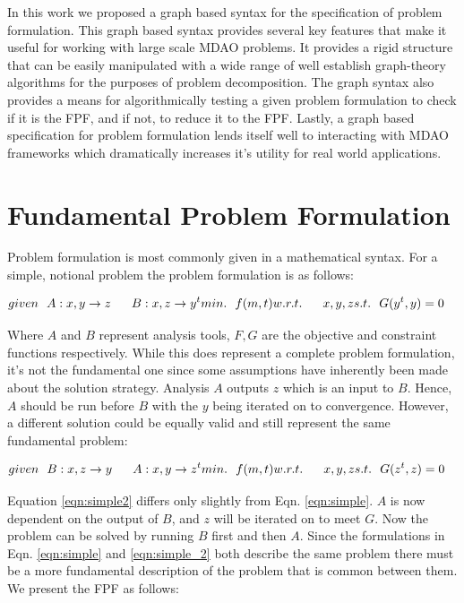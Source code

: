     In this work we proposed a graph based syntax for the specification of problem formulation. This graph based syntax provides several key
    features that make it useful for working with large scale MDAO problems. It provides a rigid structure that can be easily manipulated 
    with a wide range of well establish graph-theory algorithms for the purposes of problem decomposition. The graph syntax also 
    provides a means for algorithmically testing a given problem formulation to check if it is the FPF, and if not, to reduce it to the FPF. 
    Lastly, a graph based specification for problem formulation lends itself well to interacting with MDAO frameworks which dramatically 
    increases it's utility for real world applications. 


\section{Fundamental Problem Formulation}
    Problem formulation is most commonly given in a mathematical syntax. For a simple, notional problem 
    the problem formulation is as follows: 

    \begin{align}
        given & \ \ A: {x,y} \rightarrow {z}
              & \ \ B: {x,z} \rightarrow {y^t}
        min. &\ \ f(m,t) \notag
        w.r.t. & \ \ x,y,z \notag
        s.t. & \ \ G(y^t,y) = 0
        \label{eqn:simple}
    \end{align}

    Where $A$ and $B$ represent analysis tools, $F,G$ are the objective and constraint functions respectively. 
    While this does represent a complete problem formulation, 
    it's not the fundamental one since some assumptions have inherently been made about the solution 
    strategy. Analysis $A$ outputs $z$ which is an input to $B$. Hence, $A$ should be run before $B$ with 
    the $y$ being iterated on to convergence. However, a different solution could be equally valid and still represent
    the same fundamental problem: 

    \begin{align}
        given & \ \ B: {x,z} \rightarrow {y}
              & \ \ A: {x,y} \rightarrow {z^t}
        min. &\ \ f(m,t) \notag
        w.r.t. & \ \ x,y,z \notag
        s.t. & \ \ G(z^t,z) = 0
        \label{eqn:simple2}
    \end{align}

    Equation \ref{eqn:simple2} differs only slightly from Eqn. \ref{eqn:simple}. $A$ is now dependent on the output of $B$, 
    and $z$ will be iterated on to meet $G$. Now the problem can be solved by running $B$ first and then $A$.
    Since the formulations in Eqn. \ref{eqn:simple} and \ref{eqn:simple_2} both describe the same problem 
    there must be a more fundamental description of the problem that is common between them. We present the FPF as follows: 

